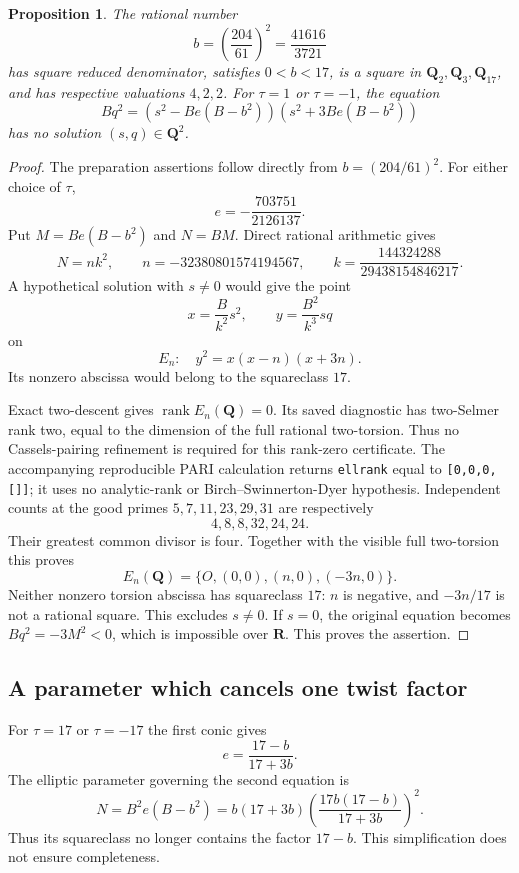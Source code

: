 \documentclass[11pt,a4paper]{article}
\newtheorem{proposition}[theorem]{Proposition}
\theoremstyle{definition}\newtheorem{definition}[theorem]{Definition}
\begin{document}
\begin{proposition}
The rational number
\[
 b=\left(\frac{204}{61}\right)^2=\frac{41616}{3721}
\]
has square reduced denominator, satisfies $0<b<17$, is a square in
$\mathbf Q_2,\mathbf Q_3,\mathbf Q_{17}$, and has respective valuations
$4,2,2$. For $\tau=1$ or $\tau=-1$, the equation
\[
 Bq^2=(s^2-Be(B-b^2))(s^2+3Be(B-b^2))
\]
has no solution $(s,q)\in\mathbf Q^2$.
\end{proposition}
\begin{proof}
The preparation assertions follow directly from $b=(204/61)^2$.
For either choice of $\tau$,
\[
 e=-\frac{703751}{2126137}.
\]
Put $M=Be(B-b^2)$ and $N=BM$. Direct rational arithmetic gives
\[
 N=nk^2,\qquad
 n=-32380801574194567,\qquad
 k=\frac{144324288}{29438154846217}.
\]
A hypothetical solution with $s\ne0$ would give the point
\[
 x=\frac{B}{k^2}s^2,\qquad y=\frac{B^2}{k^3}sq
\]
on
\[
 E_n:\quad y^2=x(x-n)(x+3n).
\]
Its nonzero abscissa would belong to the squareclass $17$.

Exact two-descent gives $\operatorname{rank}E_n(\mathbf Q)=0$.
Its saved diagnostic has two-Selmer rank two, equal to the dimension
of the full rational two-torsion. Thus no Cassels-pairing refinement
is required for this rank-zero certificate.
The accompanying reproducible PARI calculation returns
\texttt{ellrank} equal to \texttt{[0,0,0,[]]}; it uses no analytic-rank
or Birch--Swinnerton-Dyer hypothesis. Independent counts at the good
primes $5,7,11,23,29,31$ are respectively
\[
                         4,8,8,32,24,24.
\]
Their greatest common divisor is four. Together with the visible full
two-torsion this proves
\[
 E_n(\mathbf Q)=\{O,(0,0),(n,0),(-3n,0)\}.
\]
Neither nonzero torsion abscissa has squareclass $17$: $n$ is negative,
and $-3n/17$ is not a rational square. This excludes $s\ne0$.
If $s=0$, the original equation becomes $Bq^2=-3M^2<0$, which is
impossible over $\mathbf R$. This proves the assertion.
\end{proof}

\subsection{A parameter which cancels one twist factor}

For $\tau=17$ or $\tau=-17$ the first conic gives
\[
 e=\frac{17-b}{17+3b}.
\]
The elliptic parameter governing the second equation is
\[
 N=B^2e(B-b^2)
   =b(17+3b)\left(\frac{17b(17-b)}{17+3b}\right)^2.
\]
Thus its squareclass no longer contains the factor $17-b$.
This simplification does not ensure completeness.
\end{document}
